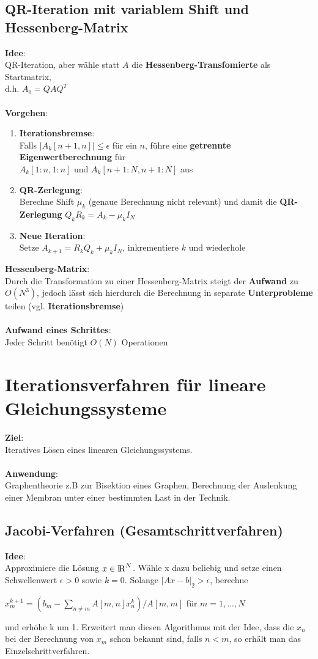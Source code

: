 \documentclass[10pt,a4paper]{article}
\def\realnumbers{{\rm I\!R}}
\begin{document}
	\subsection{QR-Iteration mit variablem Shift und Hessenberg-Matrix}
	\textbf{Idee}:\\QR-Iteration, aber wähle statt $A$ die \textbf{Hessenberg-Transfomierte} als Startmatrix,\\d.h. $A_0 = QAQ^T$\\\\
	\textbf{Vorgehen}:
	\begin{enumerate}
		\item \textbf{Iterationsbremse}:\\
		Falls $|A_k[n + 1, n]| \leq \epsilon$ für ein $n$, führe eine \textbf{getrennte Eigenwertberechnung} für\\$A_k[1 : n, 1 : n]$ und $A_k[n + 1 : N, n + 1 : N]$ aus
		\item \textbf{QR-Zerlegung}:\\
		Berechne Shift $\mu_k$ (genaue Berechnung nicht relevant) und damit die \textbf{QR-Zerlegung} $Q_kR_k = A_k - \mu_kI_N$
		\item \textbf{Neue Iteration}:\\
		Setze $A_{k+1} = R_kQ_k + \mu_kI_N$, inkrementiere $k$ und wiederhole
	\end{enumerate}
	\textbf{Hessenberg-Matrix}:\\Durch die Transformation zu einer Hessenberg-Matrix steigt der \textbf{Aufwand} zu $O(N^3)$, jedoch lässt sich hierdurch die Berechnung in separate \textbf{Unterprobleme} teilen (vgl. \textbf{Iterationsbremse})\\\\
	\textbf{Aufwand eines Schrittes}:\\Jeder Schritt benötigt $O(N)$ Operationen

	\newpage
	\section{Iterationsverfahren für lineare Gleichungssysteme}
	\textbf{Ziel}:\\Iteratives Lösen eines linearen Gleichungssystems.\\\\
	\textbf{Anwendung}:\\Graphentheorie z.B zur Bisektion eines Graphen, Berechnung der Auslenkung einer Membran unter einer bestimmten Last in der Technik.
	\subsection{Jacobi-Verfahren (Gesamtschrittverfahren)}
	\textbf{Idee}:\\Approximiere die Lösung $x \in \realnumbers^N$. Wähle x dazu beliebig und setze einen Schwellenwert $\epsilon > 0$ sowie $k = 0$. Solange $|Ax - b|_2 > \epsilon$, berechne
	\begin{center}
		$x^{k+1}_m = (b_m - \sum_{n \neq m}^{} A[m, n]x_n^k) / A[m, m]$ für $m = 1, ..., N$
	\end{center}
	und erhöhe k um 1. Erweitert man diesen Algorithmus mit der Idee, dass die $x_n$ bei der Berechnung von $x_m$ schon bekannt sind, falls $n < m$, so erhält man das Einzelschrittverfahren.
\end{document}
